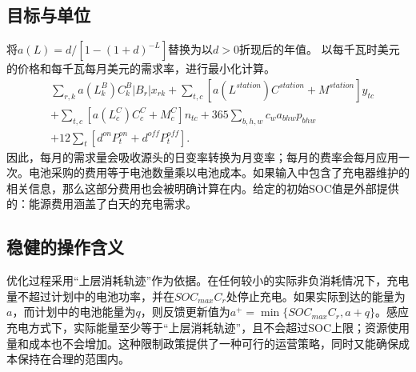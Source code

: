 \documentclass[11pt]{article}
\begin{document}
\subsection*{目标与单位}
将$a(L)=d/[1-(1+d)^{-L}]$替换为以$d>0$折现后的年值。  
以每千瓦时美元的价格和每千瓦每月美元的需求率，进行最小化计算。
\begin{align}
&\sum_{r,k}a(L_k^B)C_k^B|B_r|x_{rk}
+\sum_{t,c}[a(L^{station})C^{station}+M^{station}]y_{tc}\\
&+\sum_{t,c}[a(L_c^C)C_c^C+M_c^C]n_{tc}
+365\sum_{b,h,w}c_w a_{bhw}p_{bhw}\\
&+12\sum_t[d^{on}P_t^{on}+d^{off}P_t^{off}].
\end{align}
因此，每月的需求量会吸收源头的日变率转换为月变率；每月的费率会每月应用一次。电池采购的费用等于电池数量乘以电池成本。如果输入中包含了充电器维护的相关信息，那么这部分费用也会被明确计算在内。给定的初始SOC值是外部提供的：能源费用涵盖了白天的充电需求。

\subsection*{稳健的操作含义}
优化过程采用“上层消耗轨迹”作为依据。在任何较小的实际非负消耗情况下，充电量不超过计划中的电池功率，并在$SOC_{max}C_r$处停止充电。如果实际到达的能量为$a$，而计划中的电池能量为$q$，则反馈更新值为$a^+=\min\{SOC_{max}C_r,a+q\}$。感应充电方式下，实际能量至少等于“上层消耗轨迹”，且不会超过SOC上限；资源使用量和成本也不会增加。这种限制政策提供了一种可行的运营策略，同时又能确保成本保持在合理的范围内。
\end{document}
